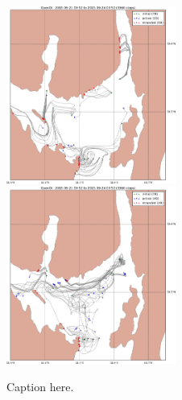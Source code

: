 \documentclass[12pt,a4paper,english]{article}
\begin{document}
\begin{figure}[ht]
\centerline{
\includegraphics*[width=0.495\textwidth]{Opendrift_simulations/LTR3/tokt_drifters_winddrift_0p1_radius_0_num_6_plusminus_2p5h_crop}
\includegraphics*[width=0.495\textwidth]{Opendrift_simulations/LTR3/tokt_drifters_winddrift_0p1_radius_0_num_6_plusminus_2p5h_norkyst_crop}
}
\caption{\small
Caption here.
}
\label{fig:opendriftD2}
\end{figure}
\end{document}
